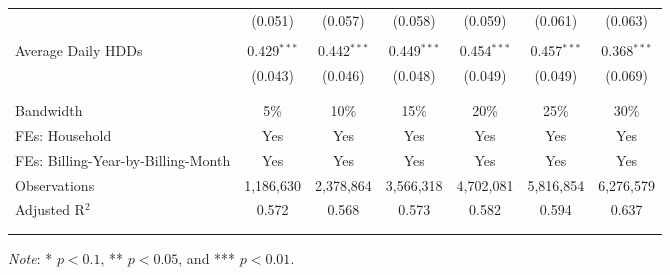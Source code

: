 {\begin{table}[t!]
\begin{adjustbox}{scale = 1.0}
\begin{threeparttable}
\begin{tabular}{@{\extracolsep{10pt}}lcccccc}
                    & (0.051) & (0.057) & (0.058) & (0.059) & (0.061) & (0.063) \\ 
                    & & & & & & \\ 
                    Average Daily HDDs & 0.429$^{***}$ & 0.442$^{***}$ & 0.449$^{***}$ & 0.454$^{***}$ & 0.457$^{***}$ & 0.368$^{***}$ \\ 
                    & (0.043) & (0.046) & (0.048) & (0.049) & (0.049) & (0.069) \\ 
                    & & & & & & \\
                    \hline
                    \\[-2.0ex]
                    Bandwidth & 5\% & 10\% & 15\% & 20\% & 25\% & 30\% \\ 
                    FEs: Household & Yes & Yes & Yes & Yes & Yes & Yes \\ 
                    FEs: Billing-Year-by-Billing-Month & Yes & Yes & Yes & Yes & Yes & Yes \\ 
                    Observations & 1,186,630 & 2,378,864 & 3,566,318 & 4,702,081 & 5,816,854 & 6,276,579 \\ 
                    Adjusted R$^{2}$ & 0.572 & 0.568 & 0.573 & 0.582 & 0.594 & 0.637 \\
                    \\[-2.0ex]
                    \hline \hline
                    \\[-4.5ex]
                \end{tabular}
                \begin{tablenotes}[flushleft]
                    \footnotesize
                    \item \textit{Note}: * $p < 0.1$, ** $p < 0.05$, and *** $p < 0.01$.
                \end{tablenotes}
            \end{threeparttable}
        \end{adjustbox}
    \end{table}
}
